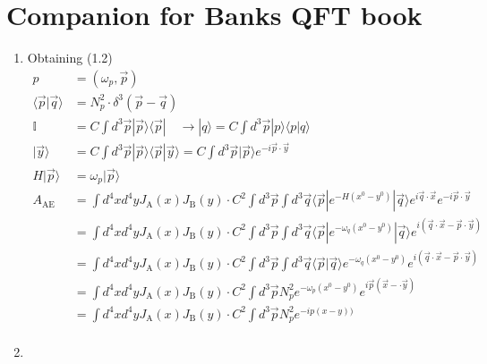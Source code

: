 \documentclass[10pt,a4paper]{book}
\theoremstyle{definition}
\begin{document}
\chapter{Companion for Banks QFT book}
\begin{enumerate}
\item Obtaining (1.2)
\begin{align*}
    p &= (\omega_p,\vec{p})\\
    \langle\vec{p}|\vec{q}\rangle&=N_p^2\cdot\delta^3(\vec{p}-\vec{q})\\
    \mathbb{I} &=C\int d^3\vec{p}|\vec{p}\rangle\langle\vec{p}|\quad\rightarrow |q\rangle=C\int d^3\vec{p}|p\rangle\langle p|q\rangle\\
    |\vec{y}\rangle &=C\int d^3\vec{p}|\vec{p}\rangle\langle\vec{p}|\vec{y}\rangle=C\int d^3\vec{p}|\vec{p}\rangle e^{-i\vec{p}\cdot\vec{y}}\\
    H|\vec{p}\rangle&=\omega_p|\vec{p}\rangle\\
    A_\text{AE}&=\int d^4xd^4y J_\text{A}(x)J_\text{B}(y)\cdot C^2\int d^3\vec{p}\int d^3\vec{q}\langle\vec{p}|e^{-H(x^0-y^0)}|\vec{q}\rangle e^{i\vec{q}\cdot\vec{x}} e^{-i\vec{p}\cdot\vec{y}}\\
    &=\int d^4xd^4y J_\text{A}(x)J_\text{B}(y)\cdot C^2\int d^3\vec{p}\int d^3\vec{q}\langle\vec{p}|e^{-\omega_q(x^0-y^0)}|\vec{q}\rangle e^{i(\vec{q}\cdot\vec{x}-\vec{p}\cdot\vec{y})}\\
    &=\int d^4xd^4y J_\text{A}(x)J_\text{B}(y)\cdot C^2\int d^3\vec{p}\int d^3\vec{q}\langle\vec{p}|\vec{q}\rangle e^{-\omega_q(x^0-y^0)} e^{i(\vec{q}\cdot\vec{x}-\vec{p}\cdot\vec{y})}\\
    &=\int d^4xd^4y J_\text{A}(x)J_\text{B}(y)\cdot C^2\int d^3\vec{p}N_p^2 e^{-\omega_p(x^0-y^0)} e^{i\vec{p}(\vec{x}-\cdot\vec{y})}\\
    &=\int d^4xd^4y J_\text{A}(x)J_\text{B}(y)\cdot C^2\int d^3\vec{p}N_p^2 e^{-ip(x-y))}\\
\end{align*}
\item

\end{enumerate}


\newpage 
\end{document}
